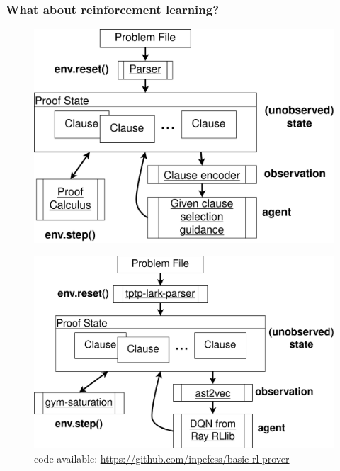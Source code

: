 \documentclass{beamer}
\begin{document}
\begin{frame}[t]
\frametitle{What about reinforcement learning?}
\begin{figure}
\includegraphics[scale=0.2]{RLSquint}
\end{figure}
\end{frame}
\begin{frame}[t]
\begin{figure}
\includegraphics[scale=0.2]{Prototype}
\caption*{code available: \url{https://github.com/inpefess/basic-rl-prover}}
\end{figure}
\end{frame}
\end{document}
